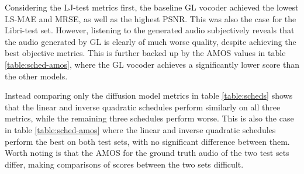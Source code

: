 \documentclass{report}
\begin{document}
Considering the LJ-test metrics first, the baseline GL vocoder achieved the lowest LS-MAE and MRSE, as well as the highest PSNR. This was also the case for the Libri-test set. However, listening to the generated audio subjectively reveals that the audio generated by GL is clearly of much worse quality, despite achieving the best objective metrics. This is further backed up by the AMOS values in table \ref{table:sched-amos}, where the GL vocoder achieves a significantly lower score than the other models.

Instead comparing only the diffusion model metrics in table \ref{table:scheds} shows that the linear and inverse quadratic schedules perform similarly on all three metrics, while the remaining three schedules perform worse. This is also the case in table \ref{table:sched-amos} where the linear and inverse quadratic schedules perform the best on both test sets, with no significant difference between them. Worth noting is that the AMOS for the ground truth audio of the two test sets differ, making comparisons of scores between the two sets difficult.

\end{document}

